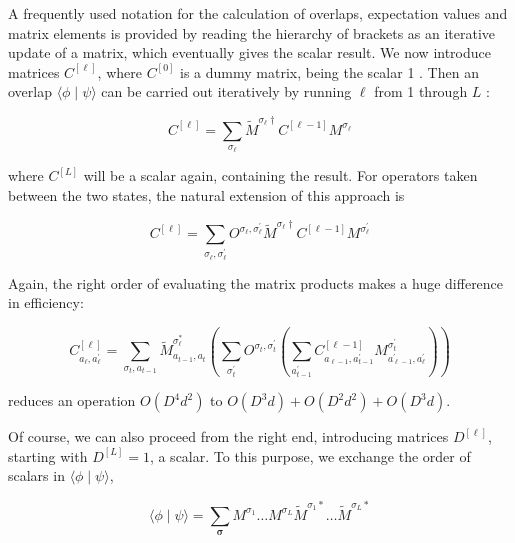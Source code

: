\documentclass[12pt]{article}
\begin{document}
A frequently used notation for the calculation of overlaps, expectation values and matrix elements is provided by reading the hierarchy of brackets as an iterative update of a matrix, which eventually gives the scalar result. We now introduce matrices $C^{[\ell]}$, where $C^{[0]}$ is a dummy matrix, being the scalar 1 . Then an overlap $\langle\phi \mid \psi\rangle$ can be carried out iteratively by running $\ell$ from 1 through $L$ :


\begin{equation*}
C^{[\ell]}=\sum_{\sigma_{\ell}} \tilde{M}^{\sigma_{\ell} \dagger} C^{[\ell-1]} M^{\sigma_{\ell}} \tag{98}
\end{equation*}


where $C^{[L]}$ will be a scalar again, containing the result. For operators taken between the two states, the natural extension of this approach is


\begin{equation*}
C^{[\ell]}=\sum_{\sigma_{\ell}, \sigma_{\ell}^{\prime}} O^{\sigma_{\ell}, \sigma_{\ell}^{\prime}} \tilde{M}^{\sigma_{\ell} \dagger} C^{[\ell-1]} M^{\sigma_{\ell}^{\prime}} \tag{99}
\end{equation*}


Again, the right order of evaluating the matrix products makes a huge difference in efficiency:


\begin{equation*}
C_{a_{\ell}, a_{\ell}^{\prime}}^{[\ell]}=\sum_{\sigma_{t}, a_{t-1}} \tilde{M}_{a_{t-1}, a_{t}}^{\sigma_{\ell}^{*}}\left(\sum_{\sigma_{t}^{\prime}} O^{\sigma_{t}, \sigma_{t}^{\prime}}\left(\sum_{a_{t-1}^{\prime}} C_{a_{\ell-1}, a_{t-1}^{\prime}}^{[\ell-1]} M_{a_{\ell-1}^{\prime}, a_{\ell}^{\prime}}^{\sigma_{t}^{\prime}}\right)\right) \tag{100}
\end{equation*}


reduces an operation $O\left(D^{4} d^{2}\right)$ to $O\left(D^{3} d\right)+O\left(D^{2} d^{2}\right)+O\left(D^{3} d\right)$.

Of course, we can also proceed from the right end, introducing matrices $D^{[\ell]}$, starting with $D^{[L]}=1$, a scalar. To this purpose, we exchange the order of scalars in $\langle\phi \mid \psi\rangle$,


\begin{equation*}
\langle\phi \mid \psi\rangle=\sum_{\boldsymbol{\sigma}} M^{\sigma_{1}} \ldots M^{\sigma_{L}} \tilde{M}^{\sigma_{1} *} \ldots \tilde{M}^{\sigma_{L} *} \tag{101}
\end{equation*}
\end{document}
